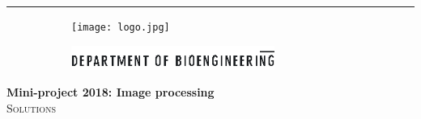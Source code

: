 %
%
%



\hrule

\begin{figure}[t]
	\begin{subfigure}[b]{0.40\linewidth} 					
    \texttt{[image: logo.jpg]}     
  \end{subfigure}
    \hfill
	\begin{subfigure}[B]{0.40\linewidth} 						
    \includegraphics[height=0.8cm]{Pictures/bioengineering_logo_right.eps}
  \end{subfigure}
    \hfill
\end{figure}

\vspace{1cm}


\begin{center}
{\large \textbf{Mini-project 2018: Image processing}} %
\\
\textsc{Solutions}
\end{center}

